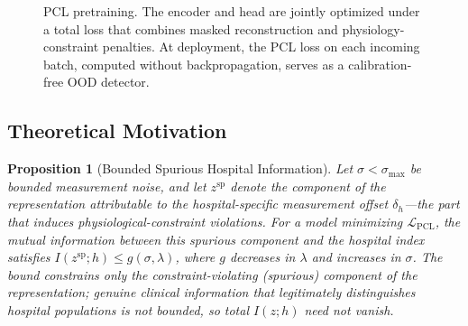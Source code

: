 \documentclass{article}
\newtheorem{proposition}{Proposition}
\begin{document}
\begin{figure}[t]
\centering
{}
\caption{PCL pretraining. The encoder and head are jointly optimized under a total loss that combines masked reconstruction and physiology-constraint penalties. At deployment, the PCL loss on each incoming batch, computed without backpropagation, serves as a calibration-free OOD detector.}
\label{fig:method}
\end{figure}

\subsection{Theoretical Motivation}
\label{sec:theory}

\begin{proposition}[Bounded Spurious Hospital Information]
\label{thm:main}
Let $\sigma < \sigma_{\max}$ be bounded measurement noise, and let $z^{\mathrm{sp}}$ denote the component of the representation attributable to the hospital-specific measurement offset $\delta_h$---the part that induces physiological-constraint violations. For a model minimizing $\mathcal{L}_{\text{PCL}}$, the mutual information between this spurious component and the hospital index satisfies $I(z^{\mathrm{sp}}; h) \leq g(\sigma, \lambda)$, where $g$ decreases in $\lambda$ and increases in $\sigma$. The bound constrains only the constraint-violating (spurious) component of the representation; genuine clinical information that legitimately distinguishes hospital populations is not bounded, so total $I(z; h)$ need not vanish.
\end{proposition}
\end{document}

